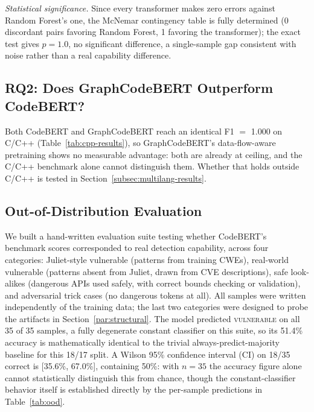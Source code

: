 \documentclass{ieeeaccess}
\begin{document}
\textit{Statistical significance.} Since every transformer makes zero errors against Random Forest's one, the McNemar contingency table is fully determined (0 discordant pairs favoring Random Forest, 1 favoring the transformer); the exact test gives $p = 1.0$, no significant difference, a single-sample gap consistent with noise rather than a real capability difference.

\subsection{RQ2: Does GraphCodeBERT Outperform CodeBERT?}
\label{subsec:rq2}
Both CodeBERT and GraphCodeBERT reach an identical F1 $=$ 1.000 on C/C++ (Table~\ref{tab:cpp-results}), so GraphCodeBERT's data-flow-aware pretraining shows no measurable advantage: both are already at ceiling, and the C/C++ benchmark alone cannot distinguish them. Whether that holds outside C/C++ is tested in Section~\ref{subsec:multilang-results}.

\subsection{Out-of-Distribution Evaluation}
\label{subsec:ood}
We built a hand-written evaluation suite testing whether CodeBERT's benchmark scores corresponded to real detection capability, across four categories: Juliet-style vulnerable (patterns from training CWEs), real-world vulnerable (patterns absent from Juliet, drawn from CVE descriptions), safe look-alikes (dangerous APIs used safely, with correct bounds checking or validation), and adversarial trick cases (no dangerous tokens at all). All samples were written independently of the training data; the last two categories were designed to probe the artifacts in Section~\ref{par:structural}. The model predicted \textsc{vulnerable} on all 35 of 35 samples, a fully degenerate constant classifier on this suite, so its 51.4\% accuracy is mathematically identical to the trivial always-predict-majority baseline for this 18/17 split. A Wilson 95\% confidence interval (CI) on 18/35 correct is [35.6\%, 67.0\%], containing 50\%: with $n = 35$ the accuracy figure alone cannot statistically distinguish this from chance, though the constant-classifier behavior itself is established directly by the per-sample predictions in Table~\ref{tab:ood}.
\end{document}
